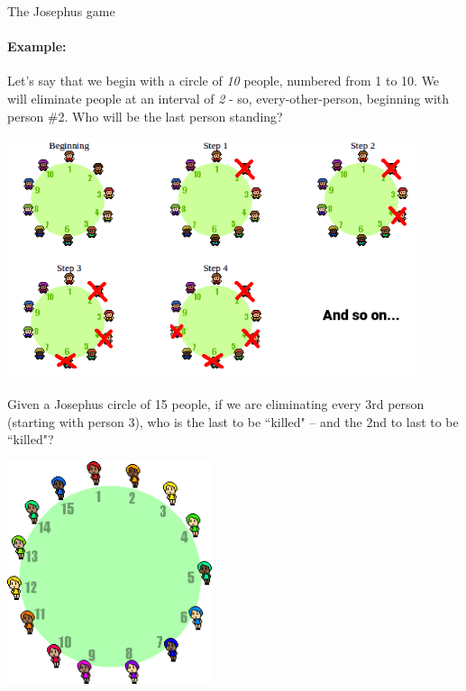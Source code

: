 {\begin{intro}{The Josephus game}
        \paragraph{Example:} Let's say that we begin with a circle of
        \textit{10} people, numbered from 1 to 10. We will eliminate
        people at an interval of \textit{2} - so, every-other-person,
        beginning with person \#2. Who will be the last person standing?

        \includegraphics[width=12cm]{images/josephus.png}
    \end{intro}

    \newpage

    \begin{questionNOGRADE}{\thequestion}
        Given a Josephus circle of 15 people,
        if we are eliminating every 3rd person (starting with person 3),
        who is the last to be ``killed" – and the 2nd to last to be ``killed"?

        \begin{center}
            \includegraphics[width=6cm]{images/josephus-15.png}
        \end{center}


\end{questionNOGRADE}}
